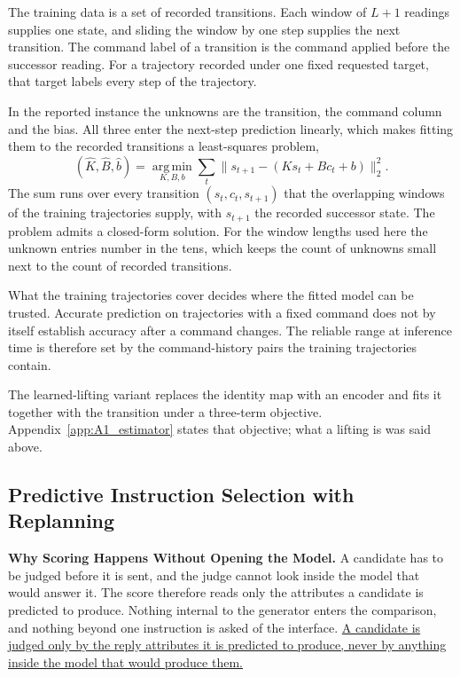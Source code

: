 The training data is a set of recorded transitions. Each window of $L+1$
readings supplies one state, and sliding the window by one step supplies the
next transition. The command label of a transition is the command applied
before the successor reading. For a trajectory recorded under one fixed
requested target, that target labels every step of the trajectory.

In the reported instance the unknowns are the transition, the command column
and the bias. All three enter the next-step prediction linearly, which makes
fitting them to the recorded transitions a least-squares problem,
\begin{equation}
    (\widehat{K},\widehat{B},\widehat{b})
    =
    \operatorname*{arg\,min}_{K,B,b}
    \sum_{t}
    \bigl\|
        s_{t+1}-(K s_t+B c_t+b)
    \bigr\|_2^2 .
    \label{eq:identification}
\end{equation}
The sum runs over every transition $(s_t,c_t,s_{t+1})$ that the overlapping
windows of the training trajectories supply, with $s_{t+1}$ the recorded
successor state. The problem admits a closed-form solution. For the window
lengths used here the unknown entries number in the tens, which keeps the
count of unknowns small next to the count of recorded transitions.

What the training trajectories cover decides where the fitted model can be
trusted. Accurate prediction on trajectories with a fixed command does not by
itself establish accuracy after a command changes. The reliable range at
inference time is therefore set by the command-history pairs the training
trajectories contain.

The learned-lifting variant replaces the identity map with an encoder and fits
it together with the transition under a three-term objective.
Appendix~\ref{app:A1_estimator} states that objective; what a lifting is was
said above.

\subsection{Predictive Instruction Selection with Replanning}
\label{sec:controller}

\textbf{Why Scoring Happens Without Opening the Model.} A candidate has to be
judged before it is sent, and the judge cannot look inside the model that
would answer it. The score therefore reads only the attributes a candidate is
predicted to produce. Nothing internal to the generator enters the comparison,
and nothing beyond one instruction is asked of the interface. \uline{A
candidate is judged only by the reply attributes it is predicted to produce,
never by anything inside the model that would produce them.}

